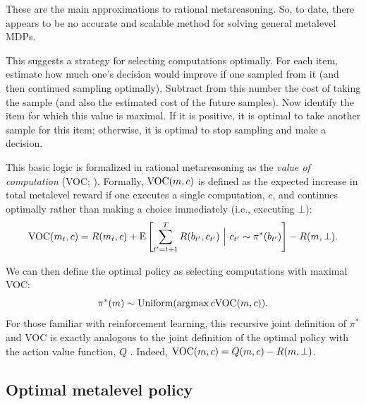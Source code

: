 These are the main approximations to rational metareasoning. So, to date, there appears to be no accurate and scalable method for solving general metalevel MDPs.


This suggests a strategy for selecting computations optimally. For each item, estimate how much one's decision would improve if one sampled from it (and then continued sampling optimally). Subtract from this number the cost of taking the sample (and also the estimated cost of the future samples). Now identify the item for which this value is maximal. If it is positive, it is optimal to take another sample for this item; otherwise, it is optimal to stop sampling and make a decision.

This basic logic is formalized in rational metareasoning as the \textit{value of computation} (VOC; \citealp{russell1991principles}). Formally, $\text{VOC}(m, c)$ is defined as the expected increase in total metalevel reward if one executes a single computation, $c$, and continues optimally rather than making a choice immediately (i.e., executing $\bot$):
$$
\text{VOC}(m_t, c) = R(m_t, c) + \operatorname*{E} \left[
  \sum_{t'=t+1}^T R(b_{t'}, c_{t'})\ \Big\vert\ c_{t'} \sim \pi^*(b_{t'}) 
\right] - R(m, \bot).
$$

We can then define the optimal policy as selecting computations with maximal VOC:
$$
\pi^*(m) \sim \text{Uniform}(\operatorname*{argmax}{c} \text{VOC}(m, c)).
$$
For those familiar with reinforcement learning, this recursive joint definition of $\pi^*$ and VOC is exactly analogous to the joint definition of the optimal policy with the action value function, $Q$ \citep{sutton2018reinforcement}. Indeed, $\text{VOC}(m, c) = Q(m, c) - R(m, \bot)$. 

\subsection{Optimal metalevel policy}


